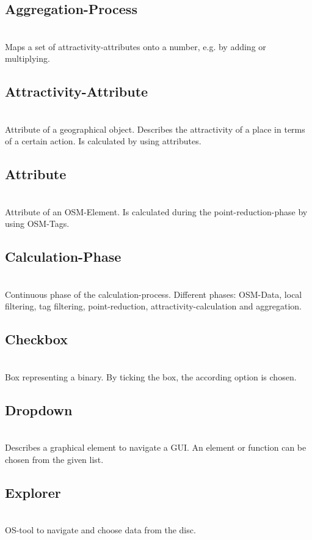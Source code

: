\documentclass[parskip=full]{scrartcl} %
\begin{document}
\subsection*{Aggregation-Process}\\
Maps a set of attractivity-attributes onto a number, e.g. by adding or multiplying.

\subsection{Attractivity-Attribute}\\
Attribute of a geographical object. Describes the attractivity of a place in terms of a certain action. Is calculated by using attributes.

\subsection{Attribute}\\
Attribute of an OSM-Element. Is calculated during the point-reduction-phase by using OSM-Tags.

\subsection{Calculation-Phase}\\
Continuous phase of the calculation-process. Different phases: OSM-Data, local filtering, tag filtering, point-reduction, attractivity-calculation and aggregation.

\subsection{Checkbox}\\
Box representing a binary. By ticking the box, the according option is chosen.

\subsection{Dropdown}\\
Describes a graphical element to navigate a GUI. An element or function can be chosen from the given list.

\subsection{Explorer}\\
OS-tool to navigate and choose data from the disc.
\end{document}
